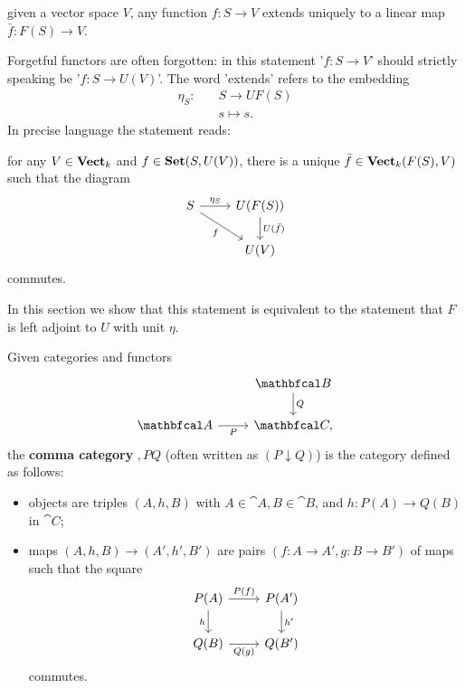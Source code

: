 \documentclass[11pt,a4paper]{article}
\begin{document}
\bigskip\noindent given a vector space $V$, any function $f:S\to V$ extends uniquely to a linear map $\bar{f}:F(S)\to V$.\par

\bigskip Forgetful functors are often forgotten: in this statement '$f:S\to V$' should strictly speaking be '$f:S\to U(V)$'. The word 'extends' refers to the embedding
\begin{align*}
    \eta_S:\quad & S\to UF(S)\\
            & s\mapsto s.
\end{align*}
In precise language the statement reads:\par\bigskip

    for any $V\in\mathbf{Vect}_k$ and $f\in\mathbf{Set}(S,U(V))$, there is a unique $\bar{f}\in\mathbf{Vect}_k(F(S),V)$ such that the diagram
    \begin{equation}\label{eq:third_adj_def}
    \begin{tikzcd}
        S \arrow[r, "\eta_S"] \arrow[dr, "f"'] & U(F(S)) \arrow[d, "U(\bar{f})"] \\
                                              & U(V)
    \end{tikzcd}
    \end{equation}
    commutes.\par\bigskip

In this section we show that this statement is equivalent to the statement that $F$ is left adjoint to $U$ with unit $\eta$.

\begin{definition}
    Given categories and functors
    \begin{equation*}
    \begin{tikzcd}
        & \cat{B} \arrow[d, "Q"]\\
        \cat{A} \arrow[r, "P"'] & \cat{C},
    \end{tikzcd}
    \end{equation*}
    the \textbf{comma category} $\comma{P}{Q}$ (often written as $(P\downarrow Q)$) is the category defined as follows:
    \begin{itemize}
        \item objects are triples $(A,h,B)$ with $A\in\cat{A}, B\in\cat{B}$, and $h: P(A)\to Q(B)$ in $\cat{C}$;
        \item maps $(A,h,B)\to (A',h',B')$ are pairs $(f:A\to A', g:B\to B')$ of maps such that the square
            \begin{equation*}
            \begin{tikzcd}
                P(A) \arrow[r, "P(f)"] \arrow[d, "h"'] & P(A') \arrow[d, "h'"] \\
                Q(B) \arrow[r, "Q(g)"'] & Q(B')
            \end{tikzcd}
            \end{equation*}
            commutes.
    \end{itemize}
\end{definition}
\end{document}
